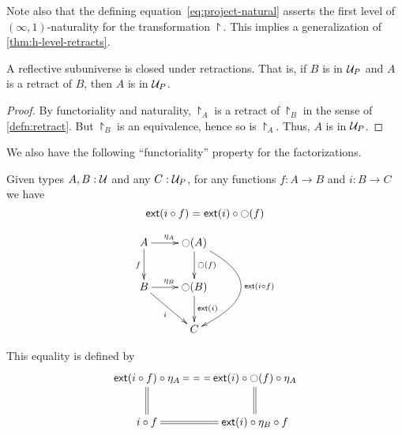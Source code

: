 



Note also that the defining equation~\eqref{eq:project-natural} asserts the first level of $(\infty,1)$-naturality for the transformation
$\project$.
This implies a generalization of \autoref{thm:h-level-retracts}.

\begin{lem}\label{thm:reflsubuniv-retract}
  A reflective subuniverse is closed under retractions.
  That is, if $B$ is in $\P$ and $A$ is a retract of $B$, then $A$ is in $\P$.
\end{lem}
\begin{proof}
  By functoriality and naturality, $\project_A$ is a retract of $\project_B$ in the sense of \autoref{defn:retract}.
  But $\project_B$ is an equivalence, hence so is $\project_A$.
  Thus, $A$ is in $\P$.
\end{proof}

We also have the following ``functoriality'' property for the factorizations.

\begin{defn}
  Given types $A,B:\type$ and any $C:\P$, for any functions $f:A\to{}B$ and $i:B\to{}C$ we have
  \[\ext(i\circ{}f)=\ext(i)\circ\reflect(f)\]

  \[\xymatrix{
    A \ar^{\project_A}[r] \ar_f[d] & \reflect(A) \ar^{\reflect(f)}[d]
    \ar@/^15mm/^{\ext(i\circ f)}[dd] \\
    B \ar^{\project_B}[r] \ar_i[rd] & \reflect(B) \ar^{\ext(i)}[d] \\
    & C}\]

  This equality is defined by
  \[\xymatrix{
    \ext(i\circ f)\circ\project_A \ar@{==}[r] \ar@{=}[d] &
    \ext(i)\circ\reflect(f)\circ\project_A \ar@{=}[d] \\
    i\circ f \ar@{=}[r] & \ext(i)\circ\project_B\circ f
  }\]

\end{defn}

